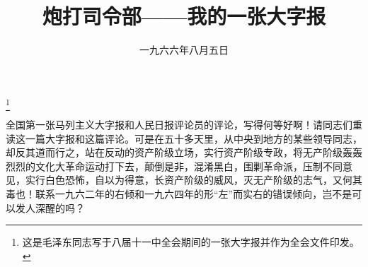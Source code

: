 
\title{炮打司令部——我的一张大字报}
\date{一九六六年八月五日}
\thanks{这是毛泽东同志写于八届十一中全会期间的一张大字报并作为全会文件印发。}
\maketitle


全国第一张马列主义大字报和人民日报评论员的评论，写得何等好啊！请同志们重读这一篇大字报和这篇评论。可是在五十多天里，从中央到地方的某些领导同志，却反其道而行之，站在反动的资产阶级立场，实行资产阶级专政，将无产阶级轰轰烈烈的文化大革命运动打下去，颠倒是非，混淆黑白，围剿革命派，压制不同意见，实行白色恐怖，自以为得意，长资产阶级的威风，灭无产阶级的志气，又何其毒也！联系一九六二年的右倾和一九六四年的形“左”而实右的错误倾向，岂不是可以发人深醒的吗？

